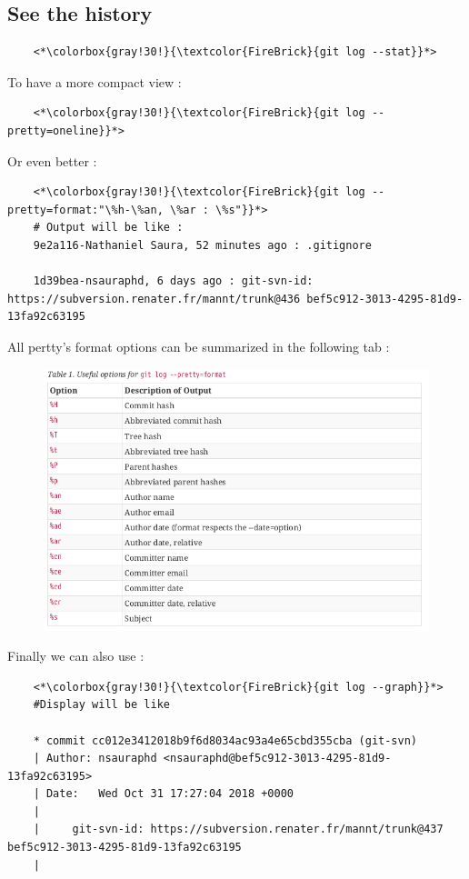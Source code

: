 \documentclass[a4paper,12pt]{article}
\numberwithin{equation}{section} %
\begin{document}
\pagebreak 

\subsection*{See the history}
\begin{lstlisting}
	<*\colorbox{gray!30!}{\textcolor{FireBrick}{git log --stat}}*>
\end{lstlisting}

To have a more compact view :
\begin{lstlisting}
	<*\colorbox{gray!30!}{\textcolor{FireBrick}{git log --pretty=oneline}}*>
\end{lstlisting}
Or even better :
\begin{lstlisting}
	<*\colorbox{gray!30!}{\textcolor{FireBrick}{git log --pretty=format:"\%h-\%an, \%ar : \%s"}}*>
	# Output will be like :
	9e2a116-Nathaniel Saura, 52 minutes ago : .gitignore
	
	1d39bea-nsauraphd, 6 days ago : git-svn-id: https://subversion.renater.fr/mannt/trunk@436 bef5c912-3013-4295-81d9-13fa92c63195
\end{lstlisting}

All pertty's format options can be summarized in the following tab :
\begin{figure}[!ht]
\centering
\includegraphics[scale=0.7]{./pic/tab_pretty.png}
\end{figure}

Finally we can also use :
\begin{lstlisting}
	<*\colorbox{gray!30!}{\textcolor{FireBrick}{git log --graph}}*>
	#Display will be like
	
	* commit cc012e3412018b9f6d8034ac93a4e65cbd355cba (git-svn)
	| Author: nsauraphd <nsauraphd@bef5c912-3013-4295-81d9-13fa92c63195>
	| Date:   Wed Oct 31 17:27:04 2018 +0000
	| 
	|     git-svn-id: https://subversion.renater.fr/mannt/trunk@437 	bef5c912-3013-4295-81d9-13fa92c63195
	| 
\end{lstlisting}
\end{document}

